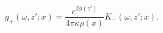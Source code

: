 \begin{equation}\label{key}
g_+(\omega,z';x)=
\frac{e^{2\phi(z')}}{4\pi\kappa\rho(x)}K_-(\omega,z';x).
\end{equation}

